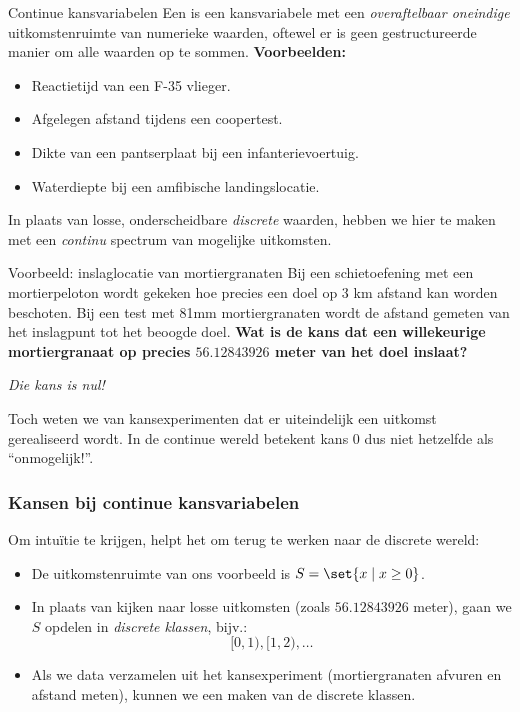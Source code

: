     \begin{frame}{Continue kansvariabelen}
        Een  is een kansvariabele met een \emph{overaftelbaar oneindige} uitkomstenruimte van numerieke waarden,
        oftewel er is geen gestructureerde manier om alle waarden op te sommen.
        \vfill
        \textbf{Voorbeelden:}
        \begin{itemize}
            \item Reactietijd van een F-35 vlieger.
            \item Afgelegen afstand tijdens een coopertest.
            \item Dikte van een pantserplaat bij een infanterievoertuig.
            \item Waterdiepte bij een amfibische landingslocatie.
        \end{itemize}
        \vfill In plaats van losse, onderscheidbare \emph{discrete} waarden, hebben we hier te maken met een \emph{continu} spectrum van mogelijke uitkomsten.
    \end{frame}

    \begin{frame}{Voorbeeld: inslaglocatie van mortiergranaten}
        Bij een schietoefening met een mortierpeloton wordt gekeken hoe precies een doel op 3 km afstand kan worden beschoten. 
        Bij een test met 81mm mortiergranaten wordt de afstand gemeten van het inslagpunt tot het beoogde doel.
        \vfill
        \textbf{Wat is de kans dat een willekeurige mortiergranaat op precies $56.12843926$ meter van het doel inslaat?}\\[1ex]
        \pause

        \emph{Die kans is nul!}
        \pause\vfill

        Toch weten we van kansexperimenten dat er uiteindelijk een uitkomst gerealiseerd wordt.
        In de continue wereld betekent kans $0$ dus niet hetzelfde als \enquote{onmogelijk!}.
    \end{frame}

    \begin{frame}\frametitle{Kansen bij continue kansvariabelen}
        Om intuïtie te krijgen, helpt het om terug te werken naar de discrete wereld:
        \begin{itemize}\setlength\itemsep{2em}
            \item De uitkomstenruimte van ons voorbeeld is $S = \set{x \mid x \geq 0}$.
            \item In plaats van kijken naar losse uitkomsten (zoals $56.12843926$ meter), gaan we $S$ opdelen in \emph{discrete klassen}, bijv.:
            \[
                [0, 1), [1, 2), \ldots
            \] 
            \item Als we data verzamelen uit het kansexperiment (mortiergranaten afvuren en afstand meten), kunnen we een  maken van de discrete klassen.
        \end{itemize}
    \end{frame}

